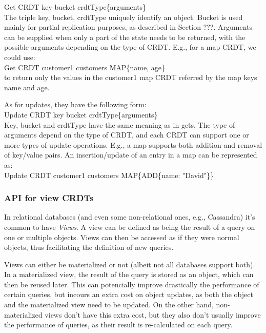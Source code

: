 \documentclass{vldb}
\begin{document}
Get CRDT key bucket crdtType\{arguments\} \\ 

The triple key, bucket, crdtType uniquely identify an object. 
Bucket is used mainly for partial replication purposes, as described in Section ???. %
Arguments can be supplied when only a part of the state needs to be returned, with the possible arguments depending on the type of CRDT. E.g., for a map CRDT, we could use: \\

Get CRDT customer1 customers MAP\{name, age\}\\

to return only the values in the customer1 map CRDT referred by the map keys name and age.

As for updates, they have the following form: \\

Update CRDT key bucket crdtType\{arguments\} \\

Key, bucket and crdtType have the same meaning as in gets.
The type of arguments depend on the type of CRDT, and each CRDT can support one or more types of update operations. 
E.g., a map supports both addition and removal of key/value pairs.
An insertion/update of an entry in a map can be represented as: \\

Update CRDT customer1 customers MAP\{ADD\{name: "David"\}\} \\

\subsubsection{API for view CRDTs}

In relational databases (and even some non-relational ones, e.g., Cassandra) it's common to have \emph{Views}. 
A view can be defined as being the result of a query on one or multiple objects.
Views can then be accessed as if they were normal objects, thus facilitating the definition of new queries.

Views can either be materialized or not (albeit not all databases support both). %
In a materialized view, the result of the query is stored as an object, which can then be reused later.
This can potencially improve drastically the performance of certain queries, but incours an extra cost on object updates, as both the object and the materialized view need to be updated.
On the other hand, non-materialized views don't have this extra cost, but they also don't usually improve the performance of queries, as their result is re-calculated on each query.
\end{document}
